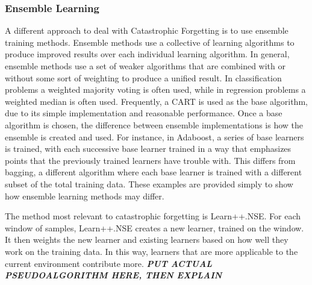 \documentclass[11pt]{report}
\begin{document}
	\subsubsection{Ensemble Learning}\label{bg:advanced_ensemble}
	\par A different approach to deal with Catastrophic Forgetting is to use ensemble training methods. Ensemble methods use a collective of learning algorithms to produce improved results over each individual learning algorithm. In general, ensemble methods use a set of weaker algorithms that are combined with or without some sort of weighting to produce a unified result. In classification problems a weighted majority voting is often used, while in regression problems a weighted median is often used. Frequently, a CART is used as the base algorithm, due to its simple implementation and reasonable performance. Once a base algorithm is chosen, the difference between ensemble implementations is how the ensemble is created and used. For instance, in Adaboost, a series of base learners is trained, with each successive base learner trained in a way that emphasizes points that the previously trained learners have trouble with. This differs from bagging, a different algorithm where each base learner is trained with a different subset of the total training data. These examples are provided simply to show how ensemble learning methods may differ.
	\par The method most relevant to catastrophic forgetting is Learn++.NSE. For each window of samples, Learn++.NSE creates a new learner, trained on the window. It then weights the new learner and existing learners based on how well they work on the training data. In this way, learners that are more applicable to the current environment contribute more.
	\textbf{\textit{PUT ACTUAL PSEUDOALGORITHM HERE, THEN EXPLAIN}}
\end{document}
